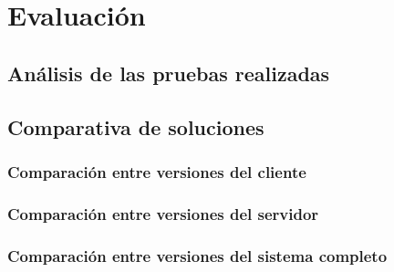 \chapter{Evaluación}

\section{Análisis de las pruebas realizadas}

\section{Comparativa de soluciones}

\subsection{Comparación entre versiones del cliente}

\subsection{Comparación entre versiones del servidor}

\subsection{Comparación entre versiones del sistema completo}


